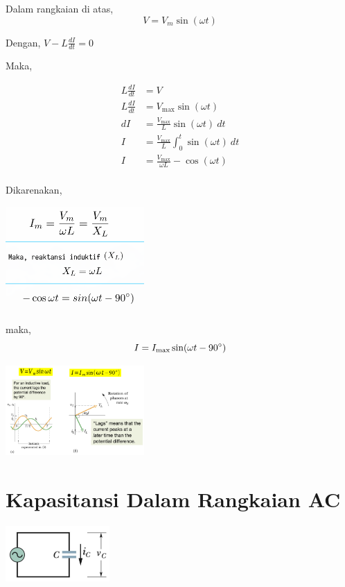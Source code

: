 \documentclass[twocolumn, 11pt]{article}%
\begin{document}
Dalam rangkaian di atas,
\[ V=V_m \sin (\omega t)\]

Dengan, $\displaystyle V-L\frac{dI}{dt}=0$

Maka,

\begin{align*}
    L\frac{dI}{dt}&=V\\
    L\frac{dI}{dt}&=V_{\text{max}}\sin(\omega t)\\
    dI&=\frac{V_{\text{max}}}{L}\sin(\omega t)\ dt\\
    I&=\frac{V_{\text{max}}}{L}\int_0^t\sin(\omega t)\ dt\\
    I&=\frac{V_{\text{max}}}{\omega L}-\cos(\omega t)\\
\end{align*}

Dikarenakan,
\begin{center}
    \includegraphics[width=200px]{6.png}
\end{center}

maka,
\[I=I_{\text{max}}\sin(\omega t-90\degree) \]

\begin{center}
    \includegraphics[width=200px]{7.png}
\end{center}

\section{Kapasitansi Dalam Rangkaian AC}%

\begin{center}
    \includegraphics[width=150px]{8.png}
\end{center}
\end{document}

